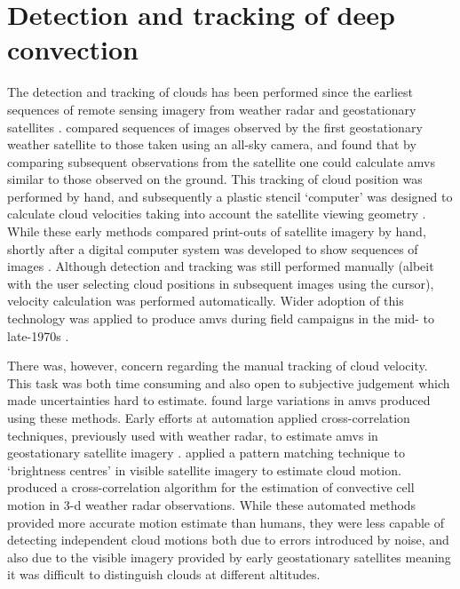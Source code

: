 

\section{Detection and tracking of deep convection}

The detection and tracking of clouds has been performed since the earliest sequences of remote sensing imagery from weather radar and geostationary satellites \citep{menzel_cloud_2001}.
\citet{fujita_study_1968} compared sequences of images observed by the first geostationary weather satellite to those taken using an all-sky camera, and found that by comparing subsequent observations from the satellite one could calculate \acrshort{amv}s similar to those observed on the ground.
This tracking of cloud position was performed by hand, and subsequently a plastic stencil `computer' was designed to calculate cloud velocities taking into account the satellite viewing geometry \citep{fujita_present_1969}.
While these early methods compared print-outs of satellite imagery by hand, shortly after a digital computer system was developed to show sequences of images \citep{chang_metracom_1973}.
Although detection and tracking was still performed manually (albeit with the user selecting cloud positions in subsequent images using the cursor), velocity calculation was performed automatically.
Wider adoption of this technology was applied to produce \acrshort{amv}s during field campaigns in the mid- to late-1970s \citep{tecson_cloud-motion_1975}.

There was, however, concern regarding the manual tracking of cloud velocity.
This task was both time consuming and also open to subjective judgement which made uncertainties hard to estimate.
\citet{fujita_satellite-tracked_1975} found large variations in \acrshort{amv}s produced using these methods.
Early efforts at automation applied cross-correlation techniques, previously used with weather radar, to estimate \acrshort{amv}s in geostationary satellite imagery \citep{leese_determination_1970}.
\citet{endlich_use_1971} applied a pattern matching technique to `brightness centres' in visible satellite imagery to estimate cloud motion.
\citet{rinehart_three-dimensional_1978} produced a cross-correlation algorithm for the estimation of convective cell motion in 3-d weather radar observations.
While these automated methods provided more accurate motion estimate than humans, they were less capable of detecting independent cloud motions both due to errors introduced by noise, and also due to the visible imagery provided by early geostationary satellites meaning it was difficult to distinguish clouds at different altitudes.

